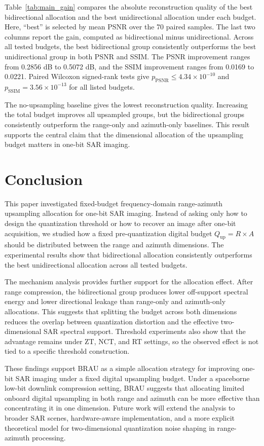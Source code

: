 \documentclass[conference]{IEEEtran}
\begin{document}
Table~\ref{tab:main_gain} compares the absolute reconstruction quality of the best bidirectional allocation and the best unidirectional allocation under each budget. Here, ``best'' is selected by mean PSNR over the 70 paired samples. The last two columns report the gain, computed as bidirectional minus unidirectional. Across all tested budgets, the best bidirectional group consistently outperforms the best unidirectional group in both PSNR and SSIM. The PSNR improvement ranges from 0.2856 dB to 0.5072 dB, and the SSIM improvement ranges from 0.0169 to 0.0221. Paired Wilcoxon signed-rank tests give $p_{\mathrm{PSNR}}\leq4.34\times10^{-10}$ and $p_{\mathrm{SSIM}}=3.56\times10^{-13}$ for all listed budgets.

The no-upsampling baseline gives the lowest reconstruction quality. Increasing the total budget improves all upsampled groups, but the bidirectional groups consistently outperform the range-only and azimuth-only baselines. This result supports the central claim that the dimensional allocation of the upsampling budget matters in one-bit SAR imaging.

\section{Conclusion}

This paper investigated fixed-budget frequency-domain range-azimuth upsampling allocation for one-bit SAR imaging. Instead of asking only how to design the quantization threshold or how to recover an image after one-bit acquisition, we studied how a fixed pre-quantization digital budget $Q_{\mathrm{up}}=R\times A$ should be distributed between the range and azimuth dimensions. The experimental results show that bidirectional allocation consistently outperforms the best unidirectional allocation across all tested budgets.

The mechanism analysis provides further support for the allocation effect. After range compression, the bidirectional group produces lower off-support spectral energy and lower directional leakage than range-only and azimuth-only allocations. This suggests that splitting the budget across both dimensions reduces the overlap between quantization distortion and the effective two-dimensional SAR spectral support. Threshold experiments also show that the advantage remains under ZT, NCT, and RT settings, so the observed effect is not tied to a specific threshold construction.

These findings support BRAU as a simple allocation strategy for improving one-bit SAR imaging under a fixed digital upsampling budget. Under a spaceborne low-bit downlink compression setting, BRAU suggests that allocating limited onboard digital upsampling in both range and azimuth can be more effective than concentrating it in one dimension. Future work will extend the analysis to broader SAR scenes, hardware-aware implementation, and a more explicit theoretical model for two-dimensional quantization noise shaping in range-azimuth processing.
\end{document}
